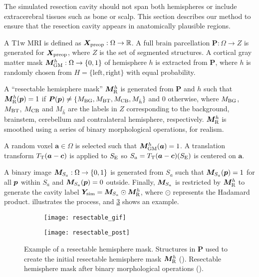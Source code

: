 The simulated resection cavity should not span both hemispheres or include extracerebral tissues such as bone or scalp.
This section describes our method to ensure that the resection cavity appears in anatomically plausible regions.

A \ac{T1w} \ac{MRI} is defined as $\bm{X}_{\text{preop}} : \Omega \to \mathbb{R}$.
A full brain parcellation $\bm{P} : \Omega \to Z$ is generated \cite{cardoso_geodesic_2015} for $\bm{X}_{\text{preop}}$,
where $Z$ is the set of segmented structures.
A cortical gray matter mask $\bm{M}_{\text{GM}}^h : \Omega \to \{0, 1\}$
of hemisphere $h$ is extracted from $\bm{P}$,
where $h$ is randomly chosen from $H = \{\text{left}, \text{right}\}$ with equal probability.

A ``resectable hemisphere mask'' $\bm{M}_{\text{R}}^h$ is generated from $\bm{P}$ and $h$ such that $\bm{M}_{\text{R}}^h (\bm{p}) = 1$ if
${\bm{P}(\bm{p}) \neq \{M_{\text{BG}}, M_{\text{BT}}, M_{\text{CB}}, M_{\hat{h}} \} }$
and $0$ otherwise,
where $M_{\text{BG}}$, $M_{\text{BT}}$, $M_{\text{CB}}$ and $M_{\hat{h}}$ are the labels in $Z$ corresponding to the background, brainstem, cerebellum and contralateral hemisphere, respectively.
$\bm{M}_{\text{R}}^h$ is smoothed using a series of binary morphological operations, for realism.


A random voxel $\bm{a} \in \Omega$ is selected such that $\bm{M}_{\text{GM}}^h(\bm{a}) = 1$.
A translation transform $T_{\text{T}}(\bm{a} - \bm{c})$ is applied to $S_{\text{E}}$ so $S_a = T_{\text{T}}(\bm{a} - \bm{c}) (S_{\text{E}})$ is centered on $\bm{a}$.

A binary image $\bm{M}_{S_a} : \Omega \to  \{ 0, 1 \}$ is generated from $S_a$ such that $\bm{M}_{S_a}(\bm{p}) = 1$ for all $\bm{p}$ within $S_a$ and $\bm{M}_{S_a}(\bm{p}) = 0$ outside.
Finally, $\bm{M}_{S_a}$ is restricted by $\bm{M}_{\text{R}}^h$ to generate the cavity label $\bm{Y}_{\text{sim}} = \bm{M}_{S_a} \odot \bm{M}_{\text{R}}^h$, where $\odot$ represents the Hadamard product.
 illustrates the process, and \cref{fig:resectable} shows an example.


\begin{figure}
  \centering

  \begin{subfigure}{\textwidth}
      \texttt{[image: resectable\_gif]}
      \caption{\label{fig:resectable_sub1}}
  \end{subfigure}

  \begin{subfigure}{\textwidth}
      \texttt{[image: resectable\_post]}
      \caption{\label{fig:resectable_sub2}}
  \end{subfigure}

  \caption[Example of a resectable hemisphere mask]{
    Example of a resectable hemisphere mask.
    Structures in $\bm{P}$ used to create the initial resectable hemisphere mask $\bm{M}_{\text{R}}^h$ ().
    Resectable hemisphere mask after binary morphological operations ().
  }
  \label{fig:resectable}
\end{figure}



